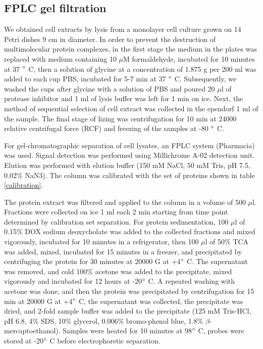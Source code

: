 \documentclass[english,authoryear]{elsarticle}
\begin{document}
\subsection{FPLC gel filtration}

We obtained cell extracts by lysis from a monolayer cell culture grown on 14 Petri dishes 9 cm in diameter.
In order to prevent the destruction of multimolecular protein complexes, in the first stage the medium in the plates was replaced with medium containing 10 $\mu$M formaldehyde, incubated for 10 minutes at 37 $\degree$ C, then a solution of glycine at a concentration of 1.875 g per 200 ml was added to each cup PBS, incubated for 5-7 min at 37 $\degree$  C. Subsequently, we washed the cups after glycine with a solution of PBS and poured 20 $\mu$l of protease inhibitor and 1 ml of lysis buffer was left for 1 min on ice.
Next, the method of sequential selection of cell extract was collected in the ependorf 1 ml of the sample. The final stage of lizing was centrifugation for 10 min at 24000 relative centrifugal force (RCF) and freezing of the samples at -80 $\degree$  C.


For gel-chromatographic separation of cell lysates, an FPLC system (Pharmacia) was used.
Signal detection was performed using Millichrome A-02 detection unit.
Elution was performed with elution buffer (150 mM NaCl, 50 mM Tris, pH 7.5, 0.02\% NaN3).
The column was calibrated with the set of proteins shown in table
\ref{calibration}.


The protein extract was filtered and applied to the column in a volume of 500 $\mu$l.
Fractions were collected on ice 1 ml each 2 min starting from time point determined by calibration set separation.
For protein sedimentation, 100 $\mu$l of 0.15\% DOX sodium deoxycholate was added to the collected fractions and mixed vigorously, incubated for 10 minutes in a refrigerator, then 100 $\mu$l of 50\% TCA was added, mixed, incubated for 15 minutes in a freezer, and precipitated by centrifuging the protein for 30 minutes at 20000 G at +4$\degree$ C.
The supernatant was removed, and cold 100\% acetone was added to the precipitate, mixed vigorously and incubated for 12 hours at -20$\degree$ C.
A repeated washing with acetone was done, and then the protein was precipitated by centrifugation for 15 min at 20000 G at +4$\degree$ C, the supernatant was collected, the precipitate was dried, and 2-fold sample buffer was added to the precipitate (125 mM Tris-HCl, pH 6.8, 4\% SDS, 10\% glycerol, 0.006\% bromo-phenol blue, 1.8\% $\beta$-mercaptoethanol).
Samples were heated for 10 minutes at 98$\degree$ C, probes were stored at -20$\degree$ C before electrophoretic separation.
\end{document}
